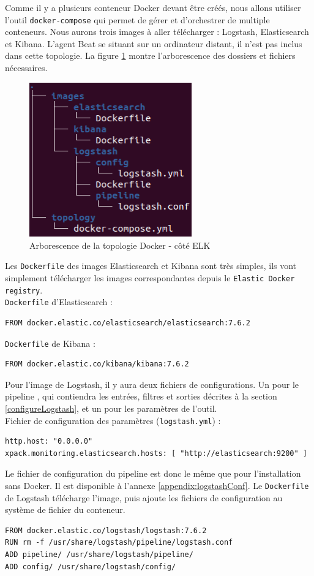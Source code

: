 \documentclass[paper=a4, fontsize=11pt]{scrartcl}
\begin{document}
Comme il y a plusieurs conteneur Docker devant être créés, nous allons utiliser l'outil \verb,docker-compose, qui permet de gérer et d'orchestrer de multiple conteneurs. Nous aurons trois images à aller télécharger : Logstash, Elasticsearch et Kibana. L'agent Beat se situant sur un ordinateur distant, il n'est pas inclus dans cette topologie. La figure \ref{f-treeDocker} montre l'arborescence des dossiers et fichiers nécessaires.
\begin{figure}[H]
    \centering
    \includegraphics[width=7cm]{img/screenshots/tree_docker.png}
    \caption{Arborescence de la topologie Docker - côté ELK}
    \label{f-treeDocker}
\end{figure}
Les \verb,Dockerfile, des images Elasticsearch et Kibana sont très simples, ils vont simplement télécharger les images correspondantes depuis le \verb,Elastic Docker registry,.\\
\verb,Dockerfile, d'Elasticsearch :
\begin{lstlisting}
FROM docker.elastic.co/elasticsearch/elasticsearch:7.6.2
\end{lstlisting}
\verb,Dockerfile, de Kibana :
\begin{lstlisting}
FROM docker.elastic.co/kibana/kibana:7.6.2
\end{lstlisting}

Pour l'image de Logstash, il y aura deux fichiers de configurations. Un pour le \og pipeline \fg, qui contiendra les entrées, filtres et sorties décrites à la section \ref{configureLogstash}, et un pour les paramètres de l'outil. \\
Fichier de configuration des paramètres (\verb,logstash.yml,) :
\begin{lstlisting}
http.host: "0.0.0.0"
xpack.monitoring.elasticsearch.hosts: [ "http://elasticsearch:9200" ]
\end{lstlisting}
Le fichier de configuration du pipeline est donc le même que pour l'installation sans Docker. Il est disponible à l'annexe \ref{appendix:logstashConf}.
Le \verb,Dockerfile, de Logstash télécharge l'image, puis ajoute les fichiers de configuration au système de fichier du conteneur.
\begin{lstlisting}
FROM docker.elastic.co/logstash/logstash:7.6.2
RUN rm -f /usr/share/logstash/pipeline/logstash.conf
ADD pipeline/ /usr/share/logstash/pipeline/
ADD config/ /usr/share/logstash/config/
\end{lstlisting}
\end{document}
